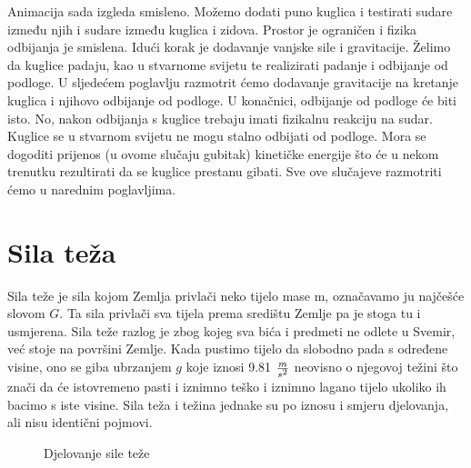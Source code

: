 Animacija sada izgleda smisleno. Možemo dodati puno kuglica i testirati sudare između njih i sudare između kuglica i zidova. Prostor je ograničen i fizika odbijanja je smislena. Idući korak je dodavanje vanjske sile i gravitacije. Želimo da kuglice padaju, kao u stvarnome svijetu te realizirati padanje i odbijanje od podloge. U sljedećem poglavlju razmotrit ćemo dodavanje gravitacije na kretanje kuglica i njihovo odbijanje od podloge. U konačnici, odbijanje od podloge će biti isto. No, nakon odbijanja s kuglice trebaju imati fizikalnu reakciju na sudar. Kuglice se u stvarnom svijetu ne mogu stalno odbijati od podloge. Mora se dogoditi prijenos (u ovome slučaju gubitak) kinetičke energije što će u nekom trenutku rezultirati da se kuglice prestanu gibati. Sve ove slučajeve razmotriti ćemo u narednim poglavljima.\newpage

\section{Sila teža} 
Sila teže je sila kojom Zemlja privlači neko tijelo mase m, označavamo ju najčešće slovom $G$. Ta sila privlači sva tijela prema središtu Zemlje pa je stoga tu i usmjerena.
Sila teže razlog je zbog kojeg sva bića i predmeti ne odlete u Svemir, već stoje na površini Zemlje.
Kada pustimo tijelo da slobodno pada s određene visine, ono se giba ubrzanjem $g$ koje iznosi 9.81 $\frac{m}{s\textsuperscript{2}}$ neovisno o njegovoj težini što znači da će istovremeno pasti i iznimno teško i iznimno lagano tijelo ukoliko ih bacimo s iste visine. 
Sila teža i težina jednake su po iznosu i smjeru djelovanja, ali nisu identični pojmovi.

\begin{figure}[!http]
	\begin{center}
	\end{center}
	\caption {Djelovanje sile teže}
	\label{fig:22}
\end{figure}

